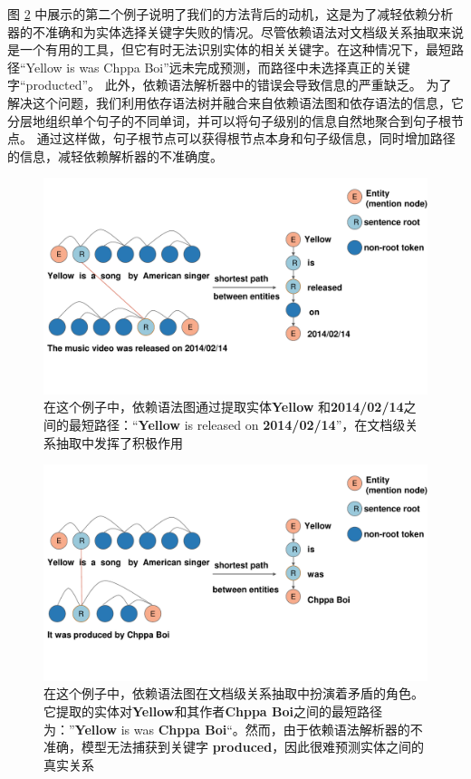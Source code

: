 \documentclass[bachelor]{thesis-uestc}
\begin{document}
图 \ref{fig_case_b} 中展示的第二个例子说明了我们的方法背后的动机，这是为了减轻依赖分析器的不准确和为实体选择关键字失败的情况。尽管依赖语法对文档级关系抽取来说是一个有用的工具，但它有时无法识别实体的相关关键字。在这种情况下，最短路径“Yellow is was Chppa Boi”远未完成预测，而路径中未选择真正的关键字“producted”。
此外，依赖语法解析器中的错误会导致信息的严重缺乏。
为了解决这个问题，我们利用依存语法树并融合来自依赖语法图和依存语法的信息，它分层地组织单个句子的不同单词，并可以将句子级别的信息自然地聚合到句子根节点。
通过这样做，句子根节点可以获得根节点本身和句子级信息，同时增加路径的信息，减轻依赖解析器的不准确度。\par

\begin{figure}[!t]
    \includegraphics[width=\linewidth]{misc/case1.pdf}
    \caption{ 在这个例子中，依赖语法图通过提取实体\textbf{Yellow} 和\textbf{2014/02/14}之间的最短路径：“\textbf{Yellow} is released on \textbf{2014/02/14}”，在文档级关系抽取中发挥了积极作用} 
    \label{fig_case_a}
\end{figure} 

\begin{figure}[t]
    \includegraphics[width=\linewidth]{misc/case2.pdf}
    \caption{在这个例子中，依赖语法图在文档级关系抽取中扮演着矛盾的角色。它提取的实体对\textbf{Yellow}和其作者\textbf{Chppa Boi}之间的最短路径为：”\textbf{Yellow} is was \textbf{Chppa Boi}“。然而，由于依赖语法解析器的不准确，模型无法捕获到关键字 \textbf{produced}，因此很难预测实体之间的真实关系}
    \label{fig_case_b}
\end{figure} 
\end{document}
